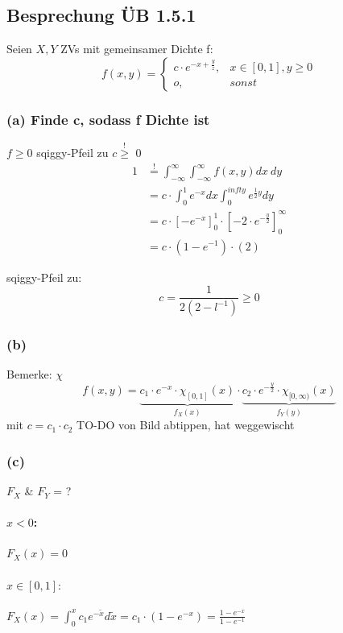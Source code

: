 \subsection{Besprechung ÜB 1.5.1}\label{sec:besprechung-ub-1.5.1}
Seien $X,Y$ ZVs mit gemeinsamer Dichte f:
\[
    f(x,y) = \begin{cases}
                 c \cdot e^{-x+ \frac{y}{z}},& x \in [0,1], y \geq 0 \\
                 o, & sonst
    \end{cases}
\]
\subsubsection*{(a) Finde c, sodass f Dichte ist}
$f \geq 0$ sqiggy-Pfeil zu $c \overset{!}{\geq}$ 0 \\

\begin{align*}
    1 & \overset{!}{=} \int^{\infty}_{-\infty}  \int^{\infty}_{-\infty} f(x,y) dx \ dy \\
    &= c \cdot \int^1_0 e^{-x} dx \int^{infty}_0 e^{\frac{1}{2}y} dy \\
    & = c \cdot [-e^{-x}]^1_0 \cdot [-2 \cdot e^{-\frac{y}{2}}]^{\infty}_0 \\
    &  = c \cdot (1-e^{-1}) \cdot (2)
\end{align*}

sqiggy-Pfeil zu:
\[
    c = \frac{1}{2(2-l^{-1})} \geq 0
\]

\subsubsection*{(b)} Bemerke: $\chi$
\[
    f(x,y) = \underbrace{c_1 \cdot e^{-x} \cdot \chi_{[0,1]}(x)}_{f_X(x)} \cdot \underbrace{c_2 \cdot e^{-\frac{y}{2}} \cdot \chi_{[0,\infty)}(x)}_{f_Y(y)}
\]
mit $c = c_1 \cdot c_2$
TO-DO von Bild abtippen, hat weggewischt %

\subsubsection*{(c)}
$F_X$ \& $F_Y$ = ?

\paragraph{$x <0$:} $F_X(x)= 0$
\paragraph{$x \in [0,1]:$}
$F_X(x)= \int_0^x c_1 e^{- \tilde x} d\tilde x = c_1 \cdot (1 - e^{-x}) = \frac{1-e^{-x}}{1-e^{-1}}$

